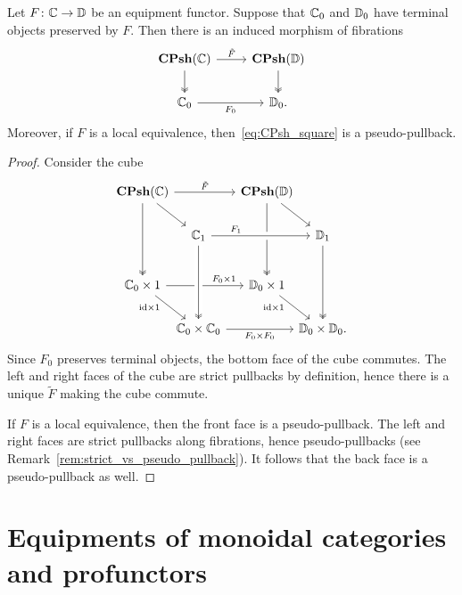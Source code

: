 \documentclass[11pt,oneside,article]{memoir}
\begin{document}
\begin{lemma}
      \label{lem:Psh_pullback}
   Let $F\colon\mathbb{C}\to\mathbb{D}$ be an equipment functor. Suppose that $\mathbb{C}_0$ and
   $\mathbb{D}_0$ have terminal objects preserved by $F$. Then there is an induced
   morphism of fibrations
   \begin{equation} \begin{tikzcd}
         \label{eq:CPsh_square}
      \CPsh(\dcat{C}) \ar[r,"\tilde{F}"] \ar[d,two heads] %
         & \CPsh(\dcat{D}) \ar[d,two heads] \\
      \dcat{C}_0 \ar[r,"F_0"']
         & \dcat{D}_0.
   \end{tikzcd} \end{equation}
   Moreover, if $F$ is a local equivalence, then~\eqref{eq:CPsh_square} is a pseudo-pullback.
\end{lemma}
\begin{proof}
   Consider the cube
   \[ \begin{tikzcd}[row sep={40,between origins}, column sep={55,between origins}]
      \CPsh(\dcat{C}) \ar[rr,"\tilde{F}"] \ar[dr] \ar[dd,two heads]
      &[-10] & \CPsh(\dcat{D}) \ar[dd,two heads] \ar[dr] &[-10] \\[-5]
      & \dcat{C}_1 \ar[rr,crossing over,"F_1" near start]
         && \dcat{D}_1 \ar[dd,two heads] \\
      \dcat{C}_0\times 1 \ar[rr,"F_0\times 1" pos=.75]
            \ar[dr,"\id\times 1"' {pos=.25,inner sep=2pt}]
         && \dcat{D}_0\times 1 \ar[dr,"\id\times 1"' {pos=.25,inner sep=2pt}] & \\[-5]
      & \dcat{C}_0\times\dcat{C}_0 \ar[rr,"F_0\times F_0"']
            \ar[from=uu,crossing over,two heads]
         && \dcat{D}_0\times\dcat{D}_0.
   \end{tikzcd} \]
   Since $F_0$ preserves terminal objects, the bottom face of the cube commutes. The left and right faces of
   the cube are strict pullbacks by definition, hence there is a unique $\tilde{F}$ making the cube commute.

   If $F$ is a local equivalence, then the front face is a pseudo-pullback. The left and right faces
   are strict pullbacks along fibrations, hence pseudo-pullbacks (see Remark~\ref{rem:strict_vs_pseudo_pullback}).  It follows that the
   back face is a pseudo-pullback as well.
\end{proof}

\chapter{Equipments of monoidal categories and profunctors}
      \label{chap:equipments_monoidal_profunctors}
\end{document}
